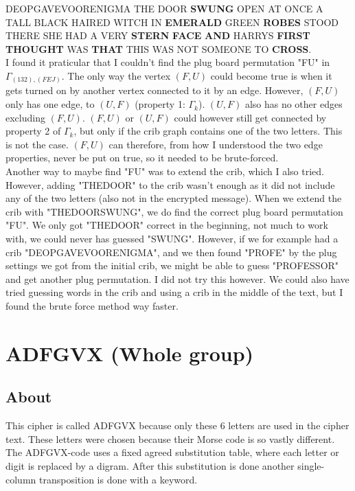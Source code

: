 \documentclass{article}
\begin{document}
DEOPGAVEVOORENIGMA THE DOOR \textbf{SWUNG} OPEN AT ONCE A TALL BLACK HAIRED WITCH IN \textbf{EMERALD} GREEN \textbf{ROBES} STOOD THERE SHE HAD A VERY \textbf{STERN} \textbf{FACE} \textbf{AND} HARRYS \textbf{FIRST} \textbf{THOUGHT} WAS \textbf{THAT} THIS WAS NOT SOMEONE TO \textbf{CROSS}.\\

I found it praticular that I couldn't find the plug board permutation "FU" in $\Gamma_{(132),(FEJ)}$. The only way the vertex $(F,U)$ could become true is when it gets turned on by another vertex connected to it by an edge. However, $(F,U)$ only has one edge, to $(U,F)$ (property 1: $\Gamma_k$). $(U,F)$ also has no other edges excluding $(F,U)$. $(F,U)$ or $(U,F)$ could however still get connected by property 2 of $\Gamma_k$, but only if the crib graph contains one of the two letters. This is not the case. $(F,U)$ can therefore, from how I understood the two edge properties, never be put on true, so it needed to be brute-forced.\\

Another way to maybe find "FU" was to extend the crib, which I also tried. However, adding "THEDOOR" to the crib wasn't enough as it did not include any of the two letters (also not in the encrypted message). When we extend the crib with "THEDOORSWUNG", we do find the correct plug board permutation "FU". We only got "THEDOOR" correct in the beginning, not much to work with, we could never has guessed "SWUNG". However, if we for example had a crib "DEOPGAVEVOORENIGMA", and we then found "PROFE" by the plug settings we got from the initial crib, we might be able to guess "PROFESSOR" and get another plug permutation. I did not try this however. We could also have tried guessing words in the crib and using a crib in the middle of the text, but I found the brute force method way faster.\\

\newpage

\section{ADFGVX (Whole group)}
\subsection{About}
This cipher is called ADFGVX because only these 6 letters are used in the cipher text. These letters were chosen because their Morse code is so vastly different. The ADFGVX-code uses a fixed agreed substitution table, where each letter or digit is replaced by a digram.  After this substitution is done another single-column transposition is done with a keyword.
\end{document}
